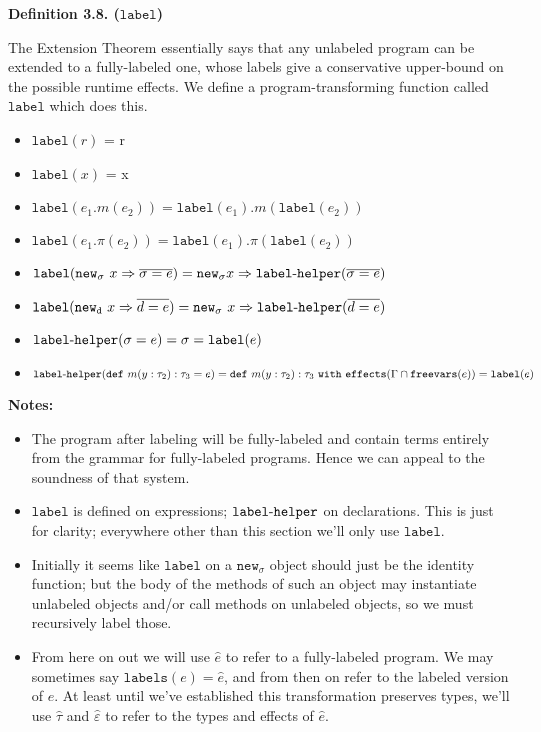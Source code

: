 \documentclass{llncs}
\newcommand{\keywadj}[1]{\mathtt{#1}}
\newcommand{\keyw}[1]{\keywadj{#1}~}
\newcommand{\hyphen}{\hbox{-}}
\begin{document}
	


\begin{large}
\bf{Definition 3.8. ($\keywadj{label}$)}
\end{large}

\noindent
The Extension Theorem essentially says that any unlabeled program can be extended to a fully-labeled one, whose labels give a conservative upper-bound on the possible runtime effects. We define a program-transforming function called $\keywadj{label}$ which does this.

\begin{itemize}
	\item $\keywadj{label}(r)$ = r
	\item $\keywadj{label}(x)$ = x
	\item $\keywadj{label}(e_1.m(e_2)) = \keywadj{label}(e_1).m(\keywadj{label}(e_2))$
	\item $\keywadj{label}(e_1.\pi(e_2)) = \keywadj{label}(e_1).\pi(\keywadj{label}(e_2))$
	\item $\keywadj{label}(\keyw{new_\sigma} x \Rightarrow \overline{\sigma = e}) = \keywadj{new}_\sigma x \Rightarrow \keywadj{label \hyphen helper}(\overline{\sigma = e})$
	\item $\keywadj{label}(\keyw{new_d} x \Rightarrow \overline{d = e}) = \keyw{new_\sigma} x \Rightarrow \keywadj{label \hyphen helper}(\overline{d = e})$
	\item $\keywadj{label \hyphen helper}(\sigma = e) = \sigma = \keywadj{label}(e)$
	\item $\keywadj{label \hyphen helper}(\keywadj{def}~m(y : \tau_2) : \tau_3 = e) = \keywadj{def}~m(y : \tau_2) : \tau_3~\keyw{with} \keywadj{effects}(\Gamma \cap \keywadj{freevars}(e)) = \keywadj{label}(e)$
\end{itemize}

\noindent \textbf{Notes:}
\begin{itemize}
\item The program after labeling will be fully-labeled and contain terms entirely from the grammar for fully-labeled programs. Hence we can appeal to the soundness of that system.
\item $\keywadj{label}$ is defined on expressions; $\keywadj{label \hyphen helper}$ on declarations. This is just for clarity; everywhere other than this section we'll only use $\keywadj{label}$.
\item Initially it seems like $\keywadj{label}$ on a $\keywadj{new_\sigma}$ object should just be the identity function; but the body of the methods of such an object may instantiate unlabeled objects and/or call methods on unlabeled objects, so we must recursively label those.
\item From here on out we will use $\hat e$ to refer to a fully-labeled program. We may sometimes say $\keywadj{labels}(e) = \hat e$, and from then on refer to the labeled version of $e$. At least until we've established this transformation preserves types, we'll use $\hat \tau$ and $\hat \varepsilon$ to refer to the types and effects of $\hat e$.
\end{itemize}
\end{document}
